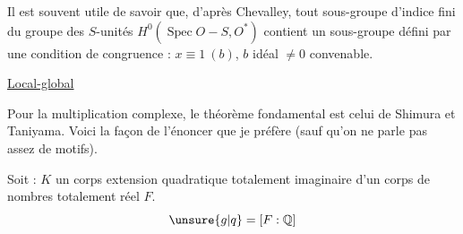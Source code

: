 Il est souvent utile de savoir que, d'après Chevalley, tout sous-groupe d'indice fini du groupe des $S$-unités $H^0(\operatorname{Spec}O-S,O^*)$  contient un sous-groupe défini par une condition de congruence : $x\equiv1\ (b)$, $b$ idéal $\ne0$ convenable.

\uline{Local-global}


\begin{center}
\end{center}

Pour la multiplication complexe, le théorème fondamental est celui de Shimura et Taniyama. Voici la façon de l'énoncer que je préfère (sauf qu'on ne parle pas assez de motifs).

Soit : $K$ un corps extension quadratique totalement imaginaire d'un corps de nombres totalement réel $F$.
\[
\unsure{g|q}=[F:\mathbb Q]
\]

